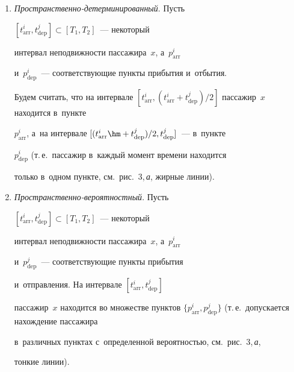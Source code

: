 \begin{enumerate}[1.]


\item 


\textit{Пространственно-детерминированный}. Пусть  


$[t^i_{\mathrm{arr}}, t^j_{\mathrm{dep}}] \subset [T_1, T_2]$~--- некоторый 


интервал не\-под\-виж\-ности пассажира~$x$, а~$p^i_{\mathrm{arr}}$ 


и~$p^i_{\mathrm{dep}}$~--- со\-от\-вет\-ст\-ву\-ющие пунк\-ты прибытия и~отбытия. 


Будем считать, что на интервале $[t^i_{\mathrm{arr}}, 


(t^i_{\mathrm{arr}} +t^j_{\mathrm{dep}})/2]$ пассажир~$x$ находится в~пункте 


$p^i_{\mathrm{arr}}$, а~на интервале $[(t^i_{\mathrm{arr}} 


\hm+ t^j_{\mathrm{dep}})/2, t^j_{\mathrm{dep}}]$~--- в~пункте 


$p^i_{\mathrm{dep}}$ (т.\,е.\ пассажир в~каждый момент времени находится 


только в~одном пунк\-те, см.\ рис.~3,\,\textit{а}, жирные линии).


\item


\textit{Пространственно-вероятностный}. Пусть 


$[t^i_{\mathrm{arr}}, t^j_{\mathrm{dep}}] \subset [T_1, T_2]$~--- некоторый 


интервал не\-под\-виж\-ности пассажира~$x$, а~$p^i_{\mathrm{arr}}$ 


и~$p^j_{\mathrm{dep}}$~--- соответствующие пунк\-ты прибытия 


и~от\-прав\-ле\-ния. На интервале $[t^i_{\mathrm{arr}}, t^j_{\mathrm{dep}}]$ 


пассажир~$x$ находится во множестве пунк\-тов $\{p^i_{\mathrm{arr}}, 


p^j_{\mathrm{dep}}\}$ (т.\,е.\ допускается на\-хож\-де\-ние пассажира 


в~различных пунктах с~определенной ве\-ро\-ят\-ностью, см.\ рис.~3,\,\textit{а}, 


тонкие линии).


\end{enumerate}











